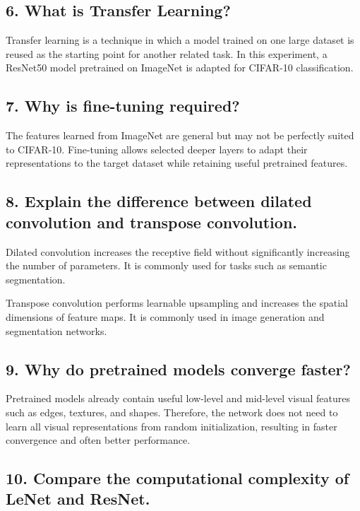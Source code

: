 \documentclass[12pt,a4paper]{article}
\begin{document}
\subsection{6. What is Transfer Learning?}

Transfer learning is a technique in which a model trained on one large dataset is reused as the starting point for another related task. In this experiment, a ResNet50 model pretrained on ImageNet is adapted for CIFAR-10 classification.

\subsection{7. Why is fine-tuning required?}

The features learned from ImageNet are general but may not be perfectly suited to CIFAR-10. Fine-tuning allows selected deeper layers to adapt their representations to the target dataset while retaining useful pretrained features.

\subsection{8. Explain the difference between dilated convolution and transpose convolution.}

Dilated convolution increases the receptive field without significantly increasing the number of parameters. It is commonly used for tasks such as semantic segmentation.

Transpose convolution performs learnable upsampling and increases the spatial dimensions of feature maps. It is commonly used in image generation and segmentation networks.

\subsection{9. Why do pretrained models converge faster?}

Pretrained models already contain useful low-level and mid-level visual features such as edges, textures, and shapes. Therefore, the network does not need to learn all visual representations from random initialization, resulting in faster convergence and often better performance.

\subsection{10. Compare the computational complexity of LeNet and ResNet.}
\end{document}
